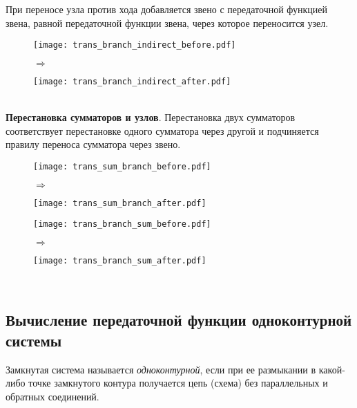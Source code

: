 \documentclass[../../TAU.tex]{subfiles}
\begin{document}
    При переносе узла против хода  добавляется звено с передаточной функцией звена, равной передаточной функции звена, через которое переносится узел. 
    \begin{figure}[h]
        \begin{minipage}[h]{0.45\linewidth}
            \texttt{[image: trans\_branch\_indirect\_before.pdf]}
        \end{minipage}
        $\Longrightarrow$
        \begin{minipage}[h]{0.45\linewidth}
            \texttt{[image: trans\_branch\_indirect\_after.pdf]}
        \end{minipage}
    \end{figure}\\
    {\bf Перестановка сумматоров и узлов}. Перестановка двух сумматоров соответствует перестановке одного сумматора через другой  и подчиняется правилу переноса сумматора через звено.
    \begin{figure}[h]
        \begin{minipage}[h]{0.45\linewidth}
            \texttt{[image: trans\_sum\_branch\_before.pdf]}
        \end{minipage}
        $\Longrightarrow$
        \begin{minipage}[h]{0.45\linewidth}
            \texttt{[image: trans\_sum\_branch\_after.pdf]}
        \end{minipage}
    \end{figure}
    \begin{figure}[h]
        \begin{minipage}[h]{0.45\linewidth}
            \texttt{[image: trans\_branch\_sum\_before.pdf]}
        \end{minipage}
    $\Longrightarrow$
        \begin{minipage}[h]{0.45\linewidth}
            \texttt{[image: trans\_branch\_sum\_after.pdf]}
        \end{minipage}
    \end{figure}\\

\subsection{Вычисление передаточной функции одноконтурной системы}

     Замкнутая система называется {\it одноконтурной}, если при ее размыкании в какой-либо точке замкнутого контура получается цепь (схема) без параллельных и обратных соединений.
\end{document}
